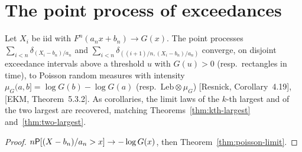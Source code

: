 \section{The point process of exceedances}

\begin{theorem}
  \label{thm:exceedances}
  \leanok
  Let $X_i$ be iid with $F^n(a_n x + b_n) \to G(x)$. The point processes
  $\sum_{i<n} \delta_{(X_i - b_n)/a_n}$ and $\sum_{i<n} \delta_{((i+1)/n, (X_i - b_n)/a_n)}$ converge, on
  disjoint exceedance intervals above a threshold $u$ with $G(u) > 0$ (resp.\ rectangles in time),
  to Poisson random measures with intensity $\mu_G(a, b] = \log G(b) - \log G(a)$
  (resp.\ $\mathrm{Leb} \otimes \mu_G$) [Resnick, Corollary~4.19], [EKM, Theorem~5.3.2]. As
  corollaries, the limit laws of the $k$-th largest and of the two largest are recovered,
  matching Theorems~\ref{thm:kth-largest} and~\ref{thm:two-largest}.
\end{theorem}
\begin{proof}
  \leanok
  $n \mathsf{P}[(X - b_n)/a_n > x] \to -\log G(x)$, then Theorem~\ref{thm:poisson-limit}.
\end{proof}
